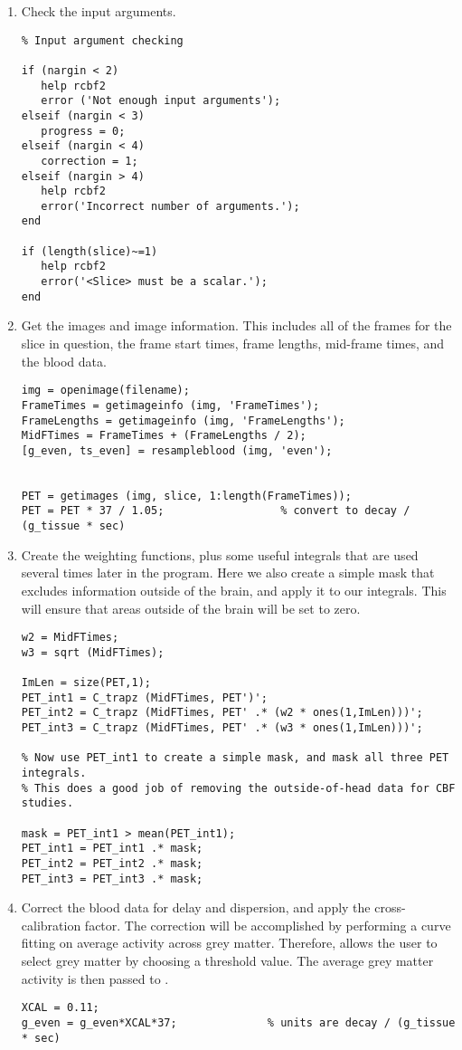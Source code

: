 \begin{enumerate}
\item Check the input arguments.
\begin{verbatim}
% Input argument checking

if (nargin < 2)
   help rcbf2
   error ('Not enough input arguments');
elseif (nargin < 3)
   progress = 0;
elseif (nargin < 4)
   correction = 1;
elseif (nargin > 4)
   help rcbf2
   error('Incorrect number of arguments.');
end

if (length(slice)~=1)
   help rcbf2
   error('<Slice> must be a scalar.');
end
\end{verbatim}

\item Get the images and image information.  This includes all of the
frames for the slice in question, the frame start times, frame
lengths, mid-frame times, and the blood data.
\begin{verbatim}
img = openimage(filename);
FrameTimes = getimageinfo (img, 'FrameTimes');
FrameLengths = getimageinfo (img, 'FrameLengths');
MidFTimes = FrameTimes + (FrameLengths / 2);
[g_even, ts_even] = resampleblood (img, 'even');


PET = getimages (img, slice, 1:length(FrameTimes));
PET = PET * 37 / 1.05;                  % convert to decay / (g_tissue * sec)
\end{verbatim}

\item Create the weighting functions, plus some useful integrals that
are used several times later in the program.  Here we also create a
simple mask that excludes information outside of the brain, and apply
it to our integrals.  This will ensure that areas outside of the
brain will be set to zero.
\begin{verbatim}
w2 = MidFTimes;
w3 = sqrt (MidFTimes);

ImLen = size(PET,1);
PET_int1 = C_trapz (MidFTimes, PET')';
PET_int2 = C_trapz (MidFTimes, PET' .* (w2 * ones(1,ImLen)))';
PET_int3 = C_trapz (MidFTimes, PET' .* (w3 * ones(1,ImLen)))';

% Now use PET_int1 to create a simple mask, and mask all three PET integrals.
% This does a good job of removing the outside-of-head data for CBF studies.

mask = PET_int1 > mean(PET_int1);
PET_int1 = PET_int1 .* mask;
PET_int2 = PET_int2 .* mask;
PET_int3 = PET_int3 .* mask;
\end{verbatim}

\item Correct the blood data for delay and dispersion, and apply the
cross-calibration factor.  The correction will be accomplished by
performing a curve fitting on average activity across grey matter.
Therefore,  allows the user to select grey matter by
choosing a threshold value.  The average grey matter activity is then
passed to .
\begin{verbatim}
XCAL = 0.11;
g_even = g_even*XCAL*37;              % units are decay / (g_tissue * sec)


\end{verbatim}
\end{enumerate}
